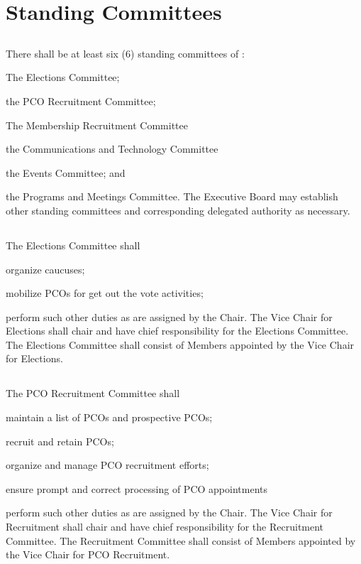 \section{Standing Committees}
\subsection{} \label{standing-committee-list}
There shall be at least six (6) standing committees of \thedistrict{}:
\begin{inlinealphalist}
    \item The Elections Committee;
    \item the PCO Recruitment Committee;
    \item The Membership Recruitment Committee
    \item the Communications and Technology Committee
    \item the Events Committee; and
    \item the Programs and Meetings Committee. The Executive Board may establish other standing committees and corresponding delegated authority as necessary.
\end{inlinealphalist}

\subsection{} \label{elections-committee}
The Elections Committee shall
\begin{inlinealphalist}
    \item organize caucuses;
    \item mobilize PCOs for get out the vote activities;
    \item perform such other duties as are assigned by the Chair. The Vice Chair for Elections shall chair and have chief responsibility for the Elections Committee. The Elections Committee shall consist of Members appointed by the Vice Chair for Elections.
\end{inlinealphalist}

\subsection{} \label{pco-recruitment-committee}
The PCO Recruitment Committee shall
\begin{inlinealphalist}
    \item maintain a list of PCOs and prospective PCOs;
    \item recruit and retain PCOs;
    \item organize and manage PCO recruitment efforts;
    \item ensure prompt and correct processing of PCO appointments
    \item perform such other duties as are assigned by the Chair. The Vice Chair for Recruitment shall chair and have chief responsibility for the Recruitment Committee.  The Recruitment Committee shall consist of Members appointed by the Vice Chair for PCO Recruitment.
\end{inlinealphalist}

